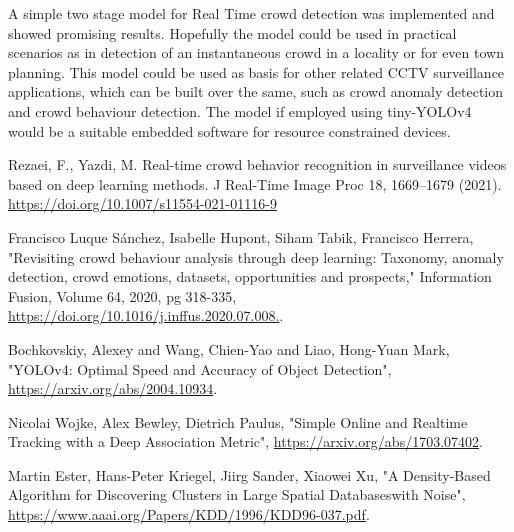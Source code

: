 \documentclass{fisatprojectfinal}
\begin{document}
A simple two stage model for Real Time crowd detection was implemented and showed promising results. Hopefully the model could be used in practical scenarios as in detection of an instantaneous crowd in a locality or for even town planning. This model could be used as basis for other related CCTV surveillance applications, which can be built over the same, such as crowd anomaly detection and crowd behaviour detection. The model if employed using tiny-YOLOv4 would be a suitable embedded software for resource constrained devices.


\begin{thebibliography}{1}
 Rezaei, F., Yazdi, M. Real-time crowd behavior recognition in surveillance videos based on deep learning methods. J Real-Time Image Proc 18, 1669–1679 (2021). \url{https://doi.org/10.1007/s11554-021-01116-9}

 Francisco Luque Sánchez, Isabelle Hupont, Siham Tabik, Francisco Herrera, "Revisiting crowd behaviour analysis through deep learning: Taxonomy, anomaly detection, crowd emotions, datasets, opportunities and prospects," Information Fusion, Volume 64, 2020, pg 318-335, \url{https://doi.org/10.1016/j.inffus.2020.07.008.}.

 Bochkovskiy, Alexey and Wang, Chien-Yao and Liao, Hong-Yuan Mark, "YOLOv4: Optimal Speed and Accuracy of Object Detection", \url{https://arxiv.org/abs/2004.10934}.

 Nicolai Wojke, Alex Bewley, Dietrich Paulus, "Simple Online and Realtime Tracking with a Deep Association Metric", \url{https://arxiv.org/abs/1703.07402}.

 Martin Ester, Hans-Peter Kriegel, Jiirg Sander, Xiaowei Xu, "A Density-Based Algorithm for Discovering Clusters
in Large Spatial Databaseswith Noise", \url{https://www.aaai.org/Papers/KDD/1996/KDD96-037.pdf}.
\end{thebibliography}
\end{document}
